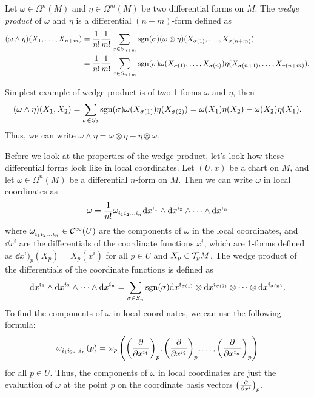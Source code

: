 \begin{definition}
    Let \(\omega \in \Omega^n(M)\) and \(\eta \in \Omega^m(M)\) be two differential forms on \(M\). The \emph{wedge product} of \(\omega\) and \(\eta\) is a differential \((n + m)\)-form defined as
    \begin{align*}
        (\omega \wedge \eta)(X_1, \ldots, X_{n+m}) & = \frac{1}{n!} \frac{1}{m!} \sum_{\sigma \in S_{n+m}} \operatorname{sgn}(\sigma) (\omega \otimes \eta)(X_{\sigma(1)}, \ldots, X_{\sigma(n+m)})                                \\
                                                   & = \frac{1}{n!} \frac{1}{m!} \sum_{\sigma \in S_{n+m}} \operatorname{sgn}(\sigma) \omega(X_{\sigma(1)}, \ldots, X_{\sigma(n)}) \eta(X_{\sigma(n+1)}, \ldots, X_{\sigma(n+m)}).
    \end{align*}
\end{definition}
Simplest example of wedge product is of two 1-forms \(\omega\) and \(\eta\), then
\begin{equation*}
    (\omega \wedge \eta)(X_1, X_2) = \sum_{\sigma \in S_2} \operatorname{sgn}(\sigma) \omega(X_{\sigma(1)}) \eta(X_{\sigma(2)}) = \omega(X_1) \eta(X_2) - \omega(X_2) \eta(X_1).
\end{equation*}
Thus, we can write \(\omega \wedge \eta = \omega \otimes \eta - \eta \otimes \omega\).

Before we look at the properties of the wedge product, let's look how these differential forms look like in local coordinates. Let \((U, x)\) be a chart on \(M\), and let \(\omega \in \Omega^n(M)\) be a differential \(n\)-form on \(M\). Then we can write \(\omega\) in local coordinates as
\begin{equation*}
    \omega = \frac{1}{n!} \tensor{\omega}{_{i_1}_{i_2}_{\ldots}_{i_n}} \dd x^{i_1} \wedge \dd x^{i_2} \wedge \cdots \wedge \dd x^{i_n}
\end{equation*}
where \(\tensor{\omega}{_{i_1}_{i_2}_{\ldots}_{i_n}} \in \SC^\infty(U)\) are the components of \(\omega\) in the local coordinates, and \(\dd x^i\) are the differentials of the coordinate functions \(x^i\), which are 1-forms defined as \(\dd x^i)_p(X_p) = X_p(x^i)\) for all \(p \in U\) and \(X_p \in \mathcal T_p M\). The wedge product of the differentials of the coordinate functions is defined as
\begin{equation*}
    \dd x^{i_1} \wedge \dd x^{i_2} \wedge \cdots \wedge \dd x^{i_n} = \sum_{\sigma \in S_n} \operatorname{sgn}(\sigma) \dd x^{i_{\sigma(1)}} \otimes \dd x^{i_{\sigma(2)}} \otimes \cdots \otimes \dd x^{i_{\sigma(n)}}.
\end{equation*}
To find the components of \(\omega\) in local coordinates, we can use the following formula:
\begin{equation*}
    \tensor{\omega}{_{i_1}_{i_2}_{\ldots}_{i_n}}(p) = \omega_p\left(\qty(\pdv{}{x^{i_1}})_p, \qty(\pdv{}{x^{i_2}})_p, \ldots, \qty(\pdv{}{x^{i_n}})_p\right)
\end{equation*}
for all \(p \in U\). Thus, the components of \(\omega\) in local coordinates are just the evaluation of \(\omega\) at the point \(p\) on the coordinate basis vectors \(\qty(\pdv{}{x^i})_p\).

